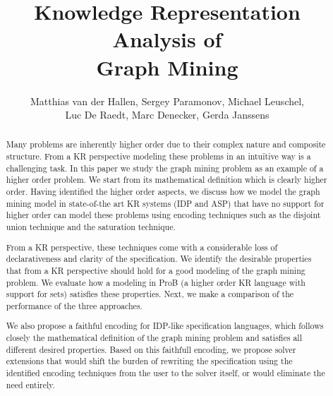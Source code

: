 \documentclass{new_tlp}
\author[]{Matthias van der Hallen, Sergey Paramonov, Michael Leuschel,\\ Luc De Raedt, Marc Denecker, Gerda Janssens}
\title{Knowledge Representation Analysis of\\ Graph Mining}
\begin{document}
\maketitle
\begin{abstract}
Many problems are inherently higher order due to their complex nature and composite structure. 
From a KR perspective modeling these problems in an intu\"itive way is a challenging task. 
In this paper we study the graph mining problem as an example of a higher order problem. 
We start from its mathematical definition which is clearly higher order. 
Having identified the higher order aspects, we discuss how we model the graph mining model 
in state-of-the art KR systems (IDP and ASP) that have no support for higher order can model these problems using encoding techniques such as the disjoint union technique and the saturation technique. 

From a KR perspective, these techniques come with a considerable loss of declarativeness and clarity of the specification. 
We identify the desirable properties that from a KR perspective should hold for a good modeling of the graph mining problem. 
We evaluate how a modeling in ProB (a higher order KR language with support for sets) satisfies these properties. 
Next, we make a comparison of the performance of the three approaches.

We also propose a faithful encoding for IDP-like specification languages, which follows closely the mathematical definition of the graph mining problem and satisfies all different desired properties.
Based on this faithfull encoding,  we propose solver extensions that would shift the burden of rewriting the specification using the identified encoding techniques from the user to the solver itself, or would eliminate the need entirely.



\end{abstract}


%









\end{document}
